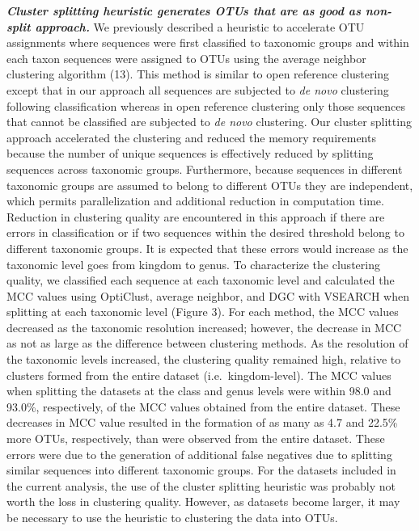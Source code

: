 \documentclass[11pt,]{article}
\begin{document}
\textbf{\emph{Cluster splitting heuristic generates OTUs that are as
good as non-split approach.}} We previously described a heuristic to
accelerate OTU assignments where sequences were first classified to
taxonomic groups and within each taxon sequences were assigned to OTUs
using the average neighbor clustering algorithm (13). This method is
similar to open reference clustering except that in our approach all
sequences are subjected to \emph{de novo} clustering following
classification whereas in open reference clustering only those sequences
that cannot be classified are subjected to \emph{de novo} clustering.
Our cluster splitting approach accelerated the clustering and reduced
the memory requirements because the number of unique sequences is
effectively reduced by splitting sequences across taxonomic groups.
Furthermore, because sequences in different taxonomic groups are assumed
to belong to different OTUs they are independent, which permits
parallelization and additional reduction in computation time. Reduction
in clustering quality are encountered in this approach if there are
errors in classification or if two sequences within the desired
threshold belong to different taxonomic groups. It is expected that
these errors would increase as the taxonomic level goes from kingdom to
genus. To characterize the clustering quality, we classified each
sequence at each taxonomic level and calculated the MCC values using
OptiClust, average neighbor, and DGC with VSEARCH when splitting at each
taxonomic level (Figure 3). For each method, the MCC values decreased as
the taxonomic resolution increased; however, the decrease in MCC as not
as large as the difference between clustering methods. As the resolution
of the taxonomic levels increased, the clustering quality remained high,
relative to clusters formed from the entire dataset
(i.e.~kingdom-level). The MCC values when splitting the datasets at the
class and genus levels were within 98.0 and 93.0\%, respectively, of the
MCC values obtained from the entire dataset. These decreases in MCC
value resulted in the formation of as many as 4.7 and 22.5\% more OTUs,
respectively, than were observed from the entire dataset. These errors
were due to the generation of additional false negatives due to
splitting similar sequences into different taxonomic groups. For the
datasets included in the current analysis, the use of the cluster
splitting heuristic was probably not worth the loss in clustering
quality. However, as datasets become larger, it may be necessary to use
the heuristic to clustering the data into OTUs.
\end{document}
